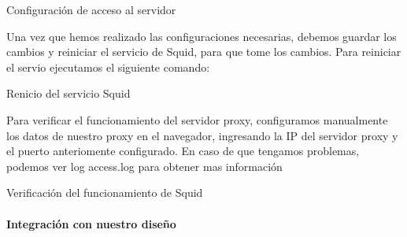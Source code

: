 \begin{listing}[H]
  \caption{Configuración de acceso al servidor}
  \label{soa:tecnologias:squid-cache05:bash-preparacion}
\end{listing}

Una vez que hemos realizado las configuraciones necesarias, debemos guardar los cambios y reiniciar el servicio de Squid, para que tome los cambios.  Para reiniciar el servio ejecutamos el siguiente comando:

\begin{listing}[H]
  \caption{Renicio del servicio Squid}
  \label{soa:tecnologias:squid-cache06:bash-preparacion}
\end{listing}

Para verificar el funcionamiento del servidor proxy, configuramos manualmente los datos de nuestro proxy en el navegador, ingresando la IP del servidor proxy y el puerto anteriomente configurado.
En caso de que tengamos problemas, podemos ver log access.log para obtener mas información

\begin{listing}[H]
  \caption{Verificación del funcionamiento de Squid}
  \label{soa:tecnologias:squid-cache07:bash-preparacion}
\end{listing}

\paragraph{Integración con nuestro diseño}
